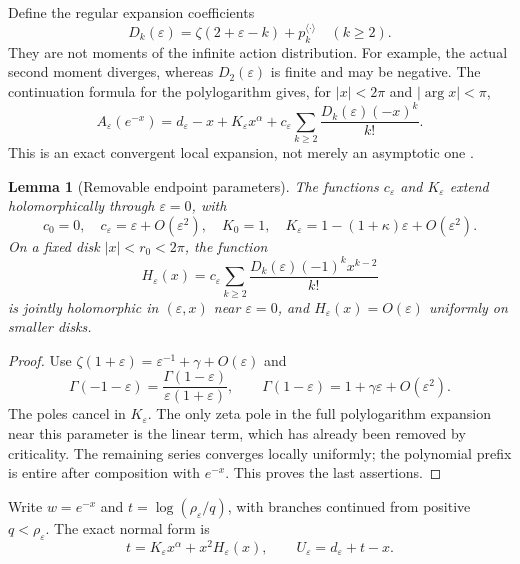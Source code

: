 \documentclass[11pt,a4paper]{article}
\newtheorem{lemma}[theorem]{Lemma}
\theoremstyle{definition}\newtheorem{definition}[theorem]{Definition}
\theoremstyle{remark}\newtheorem{remark}[theorem]{Remark}
\newcommand{\eps}{\varepsilon}
\newcommand{\1}{\mathbf 1}
\begin{document}
Define the regular expansion coefficients
\begin{equation}\label{eq:Dk}
 D_k(\eps)=\zeta(2+\eps-k)+p_k^{\langle\cdot\rangle}
 \quad(k\ge2).
\end{equation}
They are not moments of the infinite action distribution. For example,
the actual second moment diverges, whereas $D_2(\eps)$ is finite and
may be negative. The continuation formula for the polylogarithm gives,
for $|x|<2\pi$ and $|\arg x|<\pi$,
\begin{equation}\label{eq:polylog}
 A_{\eps}(e^{-x})=d_{\eps}-x+K_{\eps}x^{\alpha}
 +c_{\eps}\sum_{k\ge2}\frac{D_k(\eps)(-x)^k}{k!}.
\end{equation}
This is an exact convergent local expansion, not merely an asymptotic
one \cite{dlmf}.

\begin{lemma}[Removable endpoint parameters]\label{lem:removable}
The functions $c_{\eps}$ and $K_{\eps}$ extend holomorphically through
$\eps=0$, with
\begin{equation}\label{eq:smallparameters}
 c_0=0,\quad c_{\eps}=\eps+O(\eps^2),\quad
 K_0=1,\quad K_{\eps}=1-(1+\kappa)\eps+O(\eps^2).
\end{equation}
On a fixed disk $|x|<r_0<2\pi$, the function
\begin{equation}\label{eq:H}
 H_{\eps}(x)=c_{\eps}\sum_{k\ge2}
                  \frac{D_k(\eps)(-1)^kx^{k-2}}{k!}
\end{equation}
is jointly holomorphic in $(\eps,x)$ near $\eps=0$, and
$H_{\eps}(x)=O(\eps)$ uniformly on smaller disks.
\end{lemma}
\begin{proof}
Use $\zeta(1+\eps)=\eps^{-1}+\gamma+O(\eps)$ and
\[
 \Gamma(-1-\eps)=\frac{\Gamma(1-\eps)}{\eps(1+\eps)},
 \qquad \Gamma(1-\eps)=1+\gamma\eps+O(\eps^2).
\]
The poles cancel in $K_{\eps}$. The only zeta pole in the full
polylogarithm expansion near this parameter is the linear term, which
has already been removed by criticality. The remaining series converges
locally uniformly; the polynomial prefix is entire after composition
with $e^{-x}$. This proves the last assertions.
\end{proof}

Write $w=e^{-x}$ and $t=\log(\rho_{\eps}/q)$, with branches continued
from positive $q<\rho_{\eps}$. The exact normal form is
\begin{equation}\label{eq:normal}
 t=K_{\eps}x^{\alpha}+x^2H_{\eps}(x),
 \qquad U_{\eps}=d_{\eps}+t-x.
\end{equation}
\end{document}
